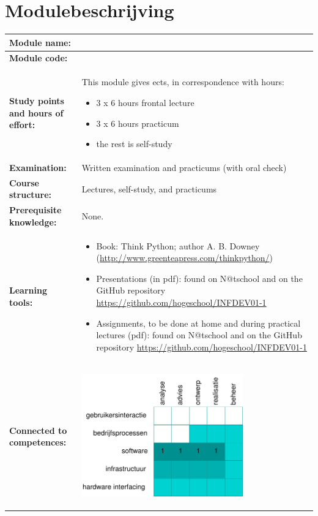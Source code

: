 \section*{Modulebeschrijving}
\begin{tabularx}{\textwidth}{|>{\columncolor{lichtGrijs}} p{}|X|}
	\hline
	\textbf{Module name:} & \modulenaam\\
	\hline
	\textbf{Module code: }& \modulecode\\
	\hline
	\textbf{Study points \newline and hours of effort:} & This module gives \stdPunten{}  ects, in correspondence with \FPeval{\result}{clip(\stdPunten*28)}\result{} hours:
	\begin{itemize}
		\item 3 x 6 hours frontal lecture
		\item 3 x 6 hours practicum
		\item the rest is self-study
	\end{itemize} \\
	\hline
	\textbf{Examination:} & Written examination and practicums (with oral check) \\
	\hline
	\textbf{Course structure:} & Lectures, self-study, and practicums \\
	\hline
	\textbf{Prerequisite knowledge:} & None. \\
	\hline
	\textbf{Learning tools:}  &
		\begin{itemize}
			\item Book: Think Python; author A. B. Downey (\url{http://www.greenteapress.com/thinkpython/})
			\item Presentations (in pdf): found on N@tschool and on the GitHub repository \url{https://github.com/hogeschool/INFDEV01-1}
			\item Assignments, to be done at home and during practical lectures (pdf): found on N@tschool and on the GitHub repository \url{https://github.com/hogeschool/INFDEV01-1}
		\end{itemize} \\
	\hline
	\textbf{Connected to \newline competences:} &
	\begin{center}
		\includegraphics[width=7cm]{img/comptabel.pdf}

\end{center}
\end{tabularx}
